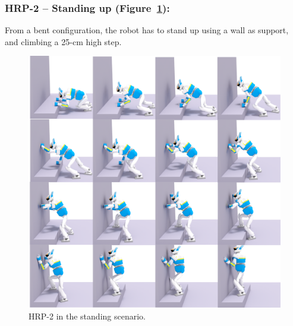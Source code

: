 
\subsubsection{HRP-2 -- Standing up (Figure~\ref{fig:standing}):}
From a bent configuration, the robot has to stand up using a wall as support, and climbing a 25-cm high step.

\begin{figure}
  \centering
  \includegraphics[width=1\linewidth]{figures/standing}
  \caption{
           HRP-2 in the standing scenario. }
		   \label{fig:standing}
\end{figure}


